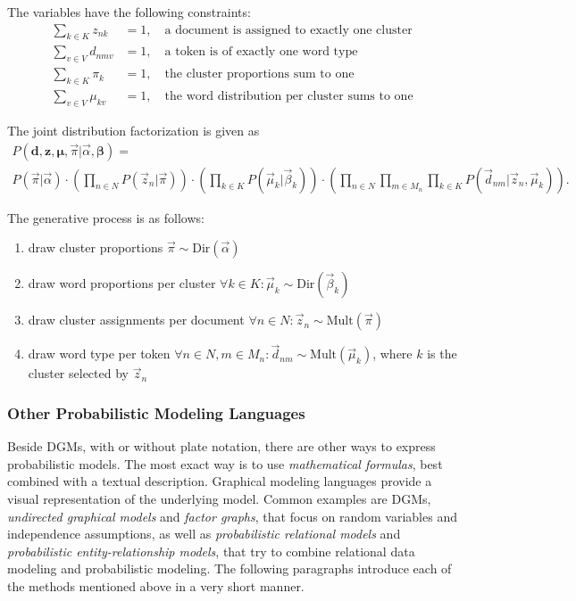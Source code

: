 \begin{Example}
The variables have the following constraints:
\begin{align}
\sum_{k \in K} z_{nk} &= 1,\quad \text{a document is assigned to exactly one cluster}\\
\sum_{v \in V} d_{nmv} &= 1,\quad \text{a token is of exactly one word type}\\
\sum_{k \in K} \pi_{k} &= 1,\quad \text{the cluster proportions sum to one}\\
\sum_{v \in V} \mu_{kv} &= 1,\quad \text{the word distribution per cluster sums to one}
\end{align}

The joint distribution factorization is given as
\begin{multline}
P(\boldsymbol{d},\boldsymbol{z}, \boldsymbol{\mu}, \vec \pi | \vec \alpha, \boldsymbol{\beta}) = \\
 P(\vec \pi | \vec \alpha) \cdot
 \left(\prod_{n \in N} P(\vec z_n | \vec \pi)\right) \cdot
 \left(\prod_{k \in K}P(\vec \mu_k | \vec \beta_k)\right) \cdot 
 \left(\prod_{n \in N} \prod_{m \in M_n} \prod_{k \in K}P(\vec d_{nm} | \vec z_n, \vec \mu_k)\right).
\end{multline}

The generative process is as follows:
\begin{enumerate}
\item draw cluster proportions $\vec \pi \sim \text{Dir}(\vec \alpha)$
\item draw word proportions per cluster $\forall k \in K: \vec \mu_k \sim \text{Dir}(\vec \beta_k)$
\item draw cluster assignments per document $\forall n \in N: \vec z_n \sim \text{Mult}(\vec \pi)$
\item draw word type per token $\forall n \in N, m \in M_n: \vec d_{nm} \sim \text{Mult}(\vec \mu_k)$, where $k$ is the cluster selected by $\vec z_n$
\end{enumerate}

\end{Example}

\subsubsection{Other Probabilistic Modeling Languages}

Beside DGMs, with or without plate notation, there are other ways to express probabilistic models. The most exact way is to use \emph{mathematical formulas}, best combined with a textual description. Graphical modeling languages provide a visual representation of the underlying model. Common examples are DGMs, \emph{undirected graphical models} and \emph{factor graphs}, that focus on random variables and independence assumptions, as well as \emph{probabilistic relational models} and \emph{probabilistic entity-relationship models}, that try to combine relational data modeling and probabilistic modeling. The following paragraphs introduce each of the methods mentioned above in a very short manner.

